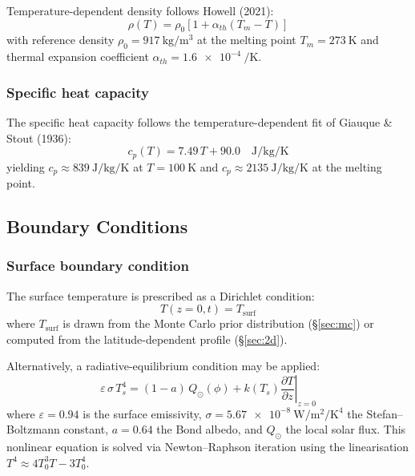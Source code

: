 \documentclass[11pt,a4paper]{article}
\newcommand{\pp}{\partial}
\begin{document}
Temperature-dependent density follows Howell (2021):
\begin{equation}
\rho(T) = \rho_0\left[1 + \alpha_{th}(T_m - T)\right]
\label{eq:density}
\end{equation}
with reference density $\rho_0 = \SI{917}{\kilo\gram\per\metre\cubed}$
at the melting point $T_m = \SI{273}{\kelvin}$ and thermal expansion
coefficient $\alpha_{th} = \SI{1.6e-4}{\per\kelvin}$.

\subsubsection{Specific heat capacity}

The specific heat capacity follows the temperature-dependent fit of
Giauque \& Stout (1936):
\begin{equation}
c_p(T) = 7.49\,T + 90.0 \quad \si{\joule\per\kilo\gram\per\kelvin}
\label{eq:cp}
\end{equation}
yielding $c_p \approx \SI{839}{\joule\per\kilo\gram\per\kelvin}$ at
$T = \SI{100}{\kelvin}$ and
$c_p \approx \SI{2135}{\joule\per\kilo\gram\per\kelvin}$ at the
melting point.

\subsection{Boundary Conditions}
\label{sec:bc}

\subsubsection{Surface boundary condition}

The surface temperature is prescribed as a Dirichlet condition:
\begin{equation}
T(z=0, t) = T_{\mathrm{surf}}
\label{eq:surf_bc}
\end{equation}
where $T_{\mathrm{surf}}$ is drawn from the Monte Carlo prior
distribution (\S\ref{sec:mc}) or computed from the latitude-dependent
profile (\S\ref{sec:2d}).

Alternatively, a radiative-equilibrium condition may be applied:
\begin{equation}
\varepsilon\,\sigma\,T_s^4
  = (1 - a)\,Q_{\odot}(\phi)
  + k(T_s)\left.\frac{\pp T}{\pp z}\right|_{z=0}
\label{eq:stefan_boltzmann}
\end{equation}
where $\varepsilon = 0.94$ is the surface emissivity,
$\sigma = \SI{5.67e-8}{\watt\per\metre\squared\per\kelvin\tothe{4}}$
the Stefan--Boltzmann constant, $a = 0.64$ the Bond albedo, and
$Q_{\odot}$ the local solar flux. This nonlinear equation is solved
via Newton--Raphson iteration using the linearisation
$T^4 \approx 4T_0^3 T - 3T_0^4$.
\end{document}
